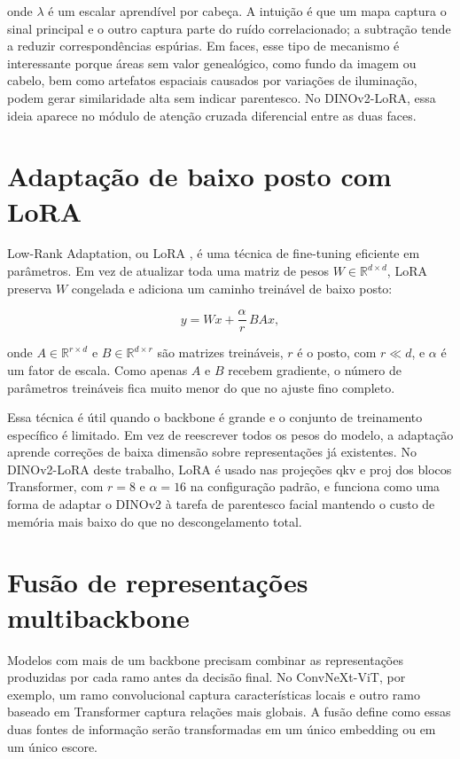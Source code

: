 onde $\lambda$ é um escalar aprendível por cabeça. A intuição é que um mapa captura o sinal principal e o outro captura parte do ruído correlacionado; a subtração tende a reduzir correspondências espúrias. Em faces, esse tipo de mecanismo é interessante porque áreas sem valor genealógico, como fundo da imagem ou cabelo, bem como artefatos espaciais causados por variações de iluminação, podem gerar similaridade alta sem indicar parentesco. No DINOv2-LoRA, essa ideia aparece no módulo de atenção cruzada diferencial entre as duas faces.

\section{Adaptação de baixo posto com LoRA}

Low-Rank Adaptation, ou LoRA \cite{hu2021lora},
é uma técnica de fine-tuning eficiente em parâmetros. Em vez de atualizar toda uma matriz de pesos $W \in \mathbb{R}^{d \times d}$, LoRA preserva $W$ congelada e adiciona um caminho treinável de baixo posto:

\begin{equation}
y = Wx + \frac{\alpha}{r} \, B A x,
\label{eq:lora}
\end{equation}

onde $A \in \mathbb{R}^{r \times d}$ e $B \in \mathbb{R}^{d \times r}$ são matrizes treináveis, $r$ é o posto, com $r \ll d$, e $\alpha$ é um fator de escala. Como apenas $A$ e $B$ recebem gradiente, o número de parâmetros treináveis fica muito menor do que no ajuste fino completo.

Essa técnica é útil quando o backbone é grande e o conjunto de treinamento específico é limitado. Em vez de reescrever todos os pesos do modelo, a adaptação aprende correções de baixa dimensão sobre representações já existentes. No DINOv2-LoRA deste trabalho, LoRA é usado nas projeções qkv e proj dos blocos Transformer, com $r=8$ e $\alpha=16$ na configuração padrão, e funciona como uma forma de adaptar o DINOv2 à tarefa de parentesco facial mantendo o custo de memória mais baixo do que no descongelamento total.

\section{Fusão de representações multibackbone}

Modelos com mais de um backbone precisam combinar as representações produzidas por cada ramo antes da decisão final. No ConvNeXt-ViT, por exemplo, um ramo convolucional captura características locais e outro ramo baseado em Transformer captura relações mais globais. A fusão define como essas duas fontes de informação serão transformadas em um único embedding ou em um único escore.

